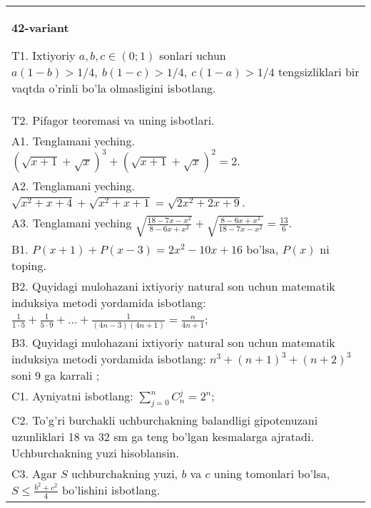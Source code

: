 \documentclass{article}
\begin{document}
\begin{tabular}{m{17cm}}
\textbf{42-variant}
\newline

T1. Ixtiyoriy \(a,b,c \in (0;1)\) sonlari uchun \(a(1 - b) > 1/4,\ b(1 - c) > 1/4,\ c(1 - a) > 1/4\) tengsizliklari bir vaqtda o'rinli bo'la olmasligini isbotlang. \\
T2. Pifagor teoremasi va uning isbotlari. \\
A1. Tenglamani yeching. \((\sqrt{x + 1} + \sqrt{x})^{3} + (\sqrt{x + 1} + \sqrt{x})^{2} = 2\). \\
A2. Tenglamani yeching. \(\sqrt{x^{2} + x + 4} + \sqrt{x^{2} + x + 1} = \sqrt{2x^{2} + 2x + 9}\). \\
A3. Tenglamani yeching \(\sqrt{\frac{18 - 7x - x^{2}}{8 - 6x + x^{2}}} + \sqrt{\frac{8 - 6x + x^{2}}{18 - 7x - x^{2}}} = \frac{13}{6}\). \\
B1. \(P(x + 1) + P(x - 3) = 2x^{2} - 10x + 16\) bo'lsa, \(P(x)\) ni toping. \\
B2. Quyidagi mulohazani ixtiyoriy natural son uchun matematik induksiya metodi yordamida isbotlang: \(\frac{1}{1 \cdot 5} + \frac{1}{5 \cdot 9} + ... + \frac{1}{(4n - 3)(4n + 1)} = \frac{n}{4n + 1}\); \\
B3. Quyidagi mulohazani ixtiyoriy natural son uchun matematik induksiya metodi yordamida isbotlang: \(n^{3} + (n + 1)^{3} + (n + 2)^{3}\) soni 9 ga karrali ; \\
C1. Ayniyatni isbotlang: \(\sum_{j = 0}^{n}C_{n}^{j} = 2^{n}\); \\
C2. To'g'ri burchakli uchburchakning balandligi gipotenuzani uzunliklari 18 va 32 sm ga teng bo'lgan kesmalarga ajratadi. Uchburchakning yuzi hisoblansin. \\
C3. Agar \(S\) uchburchakning yuzi, \(b\) va \(c\) uning tomonlari bo'lsa, \(S \leq \frac{b^{2} + c^{2}}{4}\) bo'lishini isbotlang. \\

\end{tabular}
\vspace{1cm}
\end{document}
